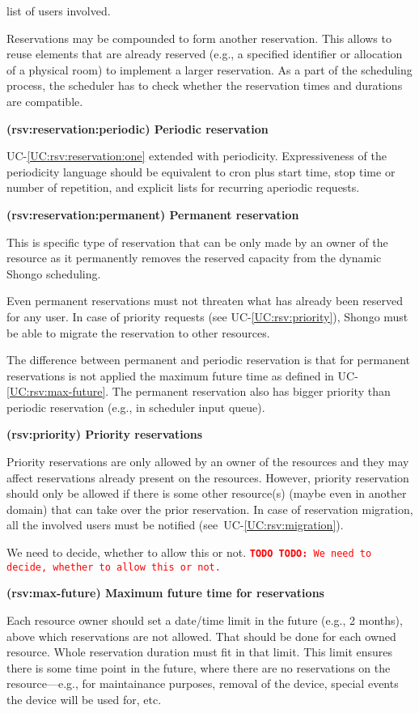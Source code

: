 \documentclass[a4paper]{report}
\makeatletter
\newcounter{UCcounter}
\newenvironment{UseCases}%
	{\begin{list}{\textbf{UC-\arabic{UCcounter}}}{\@nmbrlisttrue\def\@listctr{UCcounter}}}%
	{\end{list}}
\newcommand{\UClabel}[1]{\label{UC:#1}}
\newcommand{\UCref}[1]{UC-\ref{UC:#1}}
\newcommand{\UseCase}[2]{\item\UClabel{#2} \textbf{(#2) #1}\\ \nopagebreak}
\newcommand{\TODO}[1]{%
\def\empty{}%
\def\prvniparametr{#1}%
\ifx\prvniparametr\empty%
\begingroup\tt\textcolor{red}{\noindent\textbf{TODO}}\endgroup
\else%
\begingroup\tt\textcolor{red}{\noindent\textbf{TODO:}\ #1}\endgroup
\fi%
}
\makeatother
\begin{document}
\begin{UseCases}
\begin{compactitem}
\item list of users involved.

\end{compactitem}

Reservations may be compounded to form another reservation. This allows to
reuse elements that are already reserved (e.g., a specified identifier or
allocation of a physical room) to implement a larger reservation. As a part of
the scheduling process, the scheduler has to check whether the reservation
times and durations are compatible.


\UseCase{Periodic reservation}{rsv:reservation:periodic}

\UCref{rsv:reservation:one} extended with periodicity. Expressiveness of the
periodicity language should be equivalent to cron plus start time, stop time or number of repetition, and explicit lists for recurring aperiodic requests.

\UseCase{Permanent reservation}{rsv:reservation:permanent}

This is specific type of reservation that can be only made by an owner of the
resource as it permanently removes the reserved capacity from the dynamic
Shongo scheduling.

Even permanent reservations must not threaten what has already been reserved for any user. In case of priority requests (see \UCref{rsv:priority}), Shongo must be able to migrate the reservation to other resources.

The difference between permanent and periodic reservation is that for permanent reservations is not applied the maximum future time as defined in \UCref{rsv:max-future}. The permanent reservation also has bigger priority than periodic reservation (e.g., in scheduler input queue).

\UseCase{Priority reservations}{rsv:priority}

Priority reservations are only allowed by an owner of the resources and they
may affect reservations already present on the resources. However, priority
reservation should only be allowed if there is some other resource(s) (maybe
even in another domain) that can take over the prior reservation. In case of
reservation migration, all the involved users must be notified
(see~\UCref{rsv:migration}).

\TODO{We need to decide, whether to allow this or not.}


\UseCase{Maximum future time for reservations}{rsv:max-future}

Each resource owner should set a date/time limit in the future (e.g., 2
months), above which reservations are not allowed. That should be done for each owned resource. Whole reservation duration
must fit in that limit. This limit ensures there is some time point in the
future, where there are no reservations on the resource---e.g., for
maintainance purposes, removal of the device, special events the device will be
used for, etc.



\end{UseCases}
\end{document}
